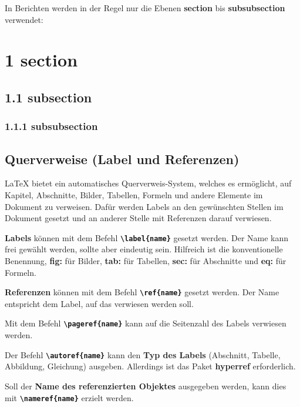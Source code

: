 In Berichten werden in der Regel nur die Ebenen \textbf{section} bis \textbf{subsubsection} verwendet:
\section*{1 \hspace{0.15cm} section}

\subsection*{1.1 \hspace{0.15cm} subsection}

\subsubsection*{1.1.1 \hspace{0.15cm} subsubsection}


\subsection{Querverweise (Label und Referenzen)}
\label{sec:querverweise}
\LaTeX{} bietet ein automatisches Querverweis-System, welches es ermöglicht, auf Kapitel, Abschnitte, Bilder, Tabellen, Formeln und andere Elemente im Dokument zu verweisen.
Dafür werden Labels an den gewünschten Stellen im Dokument gesetzt und an anderer Stelle mit Referenzen darauf verwiesen.

\textbf{Labels} können mit dem Befehl \textbf{\texttt{\textbackslash label\{name\}}} gesetzt werden. Der Name kann frei gewählt werden, sollte aber eindeutig sein. Hilfreich ist die konventionelle Benennung, \textbf{fig:} für Bilder, \textbf{tab:} für Tabellen, \textbf{sec:} für Abschnitte und \textbf{eq:} für Formeln.

\textbf{Referenzen} können mit dem Befehl \textbf{\texttt{\textbackslash ref\{name\}}} gesetzt werden. Der Name entspricht dem Label, auf das verwiesen werden soll.

Mit dem Befehl \textbf{\texttt{\textbackslash pageref\{name\}}} kann auf die Seitenzahl des Labels verwiesen werden.

Der Befehl \textbf{\texttt{\textbackslash autoref\{name\}}} kann den \textbf{Typ des Labels} (Abschnitt, Tabelle, Abbildung, Gleichung) ausgeben. Allerdings ist das Paket \textbf{hyperref} erforderlich.

Soll der \textbf{Name des referenzierten Objektes} ausgegeben werden, kann dies mit \textbf{\texttt{\textbackslash nameref\{name\}}} erzielt werden.


